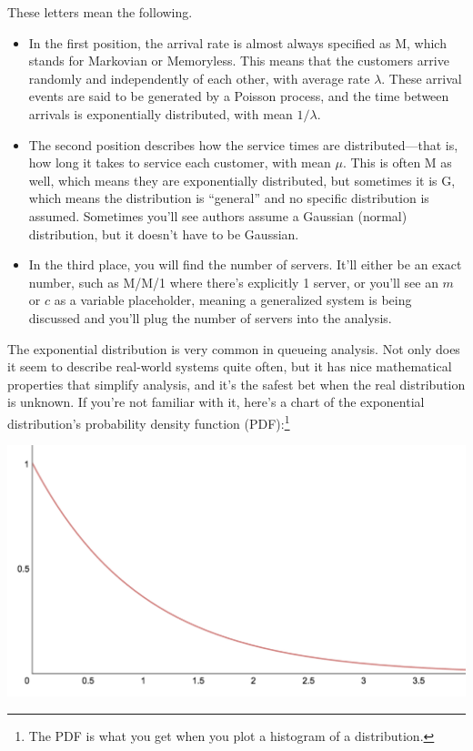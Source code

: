 \documentclass{vivid_layout_pdf}
\begin{document}
These letters mean the following.

\begin{itemize}
\item In the first position, the arrival rate is almost always specified as M, which stands for Markovian or Memoryless. This means that the customers arrive randomly and independently of each other, with average rate \( \lambda \). These arrival events are said to be generated by a Poisson process, and the time between arrivals is exponentially distributed, with mean \( 1/\lambda \).
\item The second position describes how the service times are distributed---that is, how long it takes to service each customer, with mean \( \mu \). This is often M as well, which means they are exponentially distributed, but sometimes it is G, which means the distribution is ``general'' and no specific distribution is assumed. Sometimes you'll see authors assume a Gaussian (normal) distribution, but it doesn't have to be Gaussian.
\item In the third place, you will find the number of servers. It'll either be an exact number, such as M/M/1 where there's explicitly 1 server, or you'll see an $m$ or $c$ as a variable placeholder, meaning a generalized system is being discussed and you'll plug the number of servers into the analysis.
\end{itemize}

The exponential distribution is very common in queueing analysis. Not only does it seem to describe real-world systems quite often, but it has nice mathematical properties that simplify analysis, and it's the safest bet when the real distribution is unknown. If you're not familiar with it, here's a chart of the exponential distribution's probability density function (PDF):\footnote{The PDF is what you get when you plot a histogram of a distribution.}

\begin{center}
\includegraphics[width=.75\linewidth]{exp}
\end{center}
\end{document}
